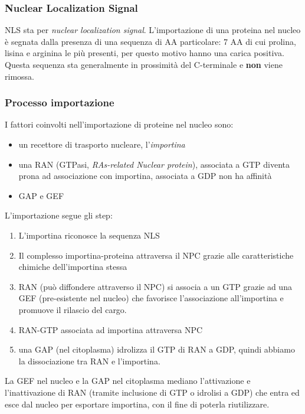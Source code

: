         \subsubsection{Nuclear Localization Signal}
            NLS sta per \textit{nuclear localization signal}. L'importazione di una proteina nel nucleo è segnata dalla presenza di una sequenza di AA particolare: 7 AA di cui prolina, lisina e arginina le più presenti, per questo motivo hanno una carica positiva. \\
            Questa sequenza sta generalmente in prossimità del C-terminale e \textbf{non} viene rimossa.
            
        \subsubsection{Processo importazione}
            I fattori coinvolti nell'importazione di proteine nel nucleo sono:
            \begin{itemize}
                \item un recettore di trasporto nucleare, l'\textit{importina}
                \item una RAN (GTPasi, \textit{RAs-related Nuclear protein}), associata a GTP diventa prona ad associazione con importina, associata a GDP non ha affinità
                \item GAP e GEF
            \end{itemize}
            L'importazione segue gli step:
            \begin{enumerate}
                \item L'importina riconosce la sequenza NLS
                \item Il complesso importina-proteina attraversa il NPC grazie alle caratteristiche chimiche dell'importina stessa
                \item RAN (può diffondere attraverso il NPC) si associa a un GTP grazie ad una GEF (pre-esistente nel nucleo) che favorisce l'associazione all'importina e promuove il rilascio del cargo.
                \item RAN-GTP associata ad importina attraversa NPC
                \item una GAP (nel citoplasma) idrolizza il GTP di RAN a GDP, quindi abbiamo la dissociazione tra RAN e l'importina.
            \end{enumerate}
            La GEF nel nucleo e la GAP nel citoplasma mediano l'attivazione e l'inattivazione di RAN (tramite inclusione di GTP o idrolisi a GDP) che entra ed esce dal nucleo per esportare importina, con il fine di poterla riutilizzare.\\
